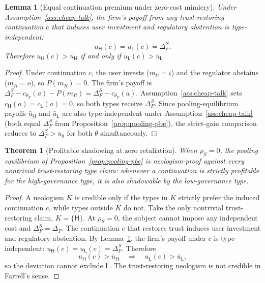 \documentclass[preprint,authoryear]{elsarticle}
\newtheorem{lemma}{Lemma}
\newtheorem{theorem}{Theorem}
\theoremstyle{definition}
\theoremstyle{plain}
\begin{document}
\begin{lemma}[Equal continuation premium under zero-cost mimicry]
\label{lem:equal-continuation}
Under Assumption~\ref{ass:cheap-talk}, the firm's payoff from any
trust-restoring continuation $c$ that induces user investment and regulatory
abstention is type-independent:
\[
u_\mathsf{H}(c)=u_\mathsf{L}(c)=\Delta_F^S .
\]
Therefore $u_\mathsf{H}(c)>\bar u_\mathsf{H}$ if and only if
$u_\mathsf{L}(c)>\bar u_\mathsf{L}$.
\end{lemma}
\begin{proof}
Under continuation $c$, the user invests ($m_U=i$) and the regulator abstains
($m_R=o$), so $P(m_R)=0$.  The firm's payoff is
$\Delta_F^S-c_{\theta_F}(a)-P(m_R)=\Delta_F^S-c_{\theta_F}(a)$.
Assumption~\ref{ass:cheap-talk} sets $c_\mathsf{H}(a)=c_\mathsf{L}(a)=0$,
so both types receive $\Delta_F^S$.  Since pooling-equilibrium payoffs
$\bar u_\mathsf{H}$ and $\bar u_\mathsf{L}$ are also type-independent under
Assumption~\ref{ass:cheap-talk} (both equal $\Delta_F^S$ from
Proposition~\ref{prop:pooling-pbe}), the strict-gain comparison reduces to
$\Delta_F^S>\bar u_\theta$ for both $\theta$ simultaneously.
\end{proof}

\begin{theorem}[Profitable shadowing at zero retaliation]
\label{thm:zero-retaliation-shadowing}
\label{thm:neologism}
When $\rho_S=0$, the pooling equilibrium of Proposition~\ref{prop:pooling-pbe} is neologism-proof against every nontrivial trust-restoring type claim: whenever a continuation is strictly profitable for the high-governance type, it is also shadowable by the low-governance type.
\end{theorem}
\begin{proof}
A neologism $K$ is credible only if the types in $K$ strictly prefer the induced continuation $c$, while types outside $K$ do not.  Take the only nontrivial trust-restoring claim, $K=\{\mathsf{H}\}$.  At $\rho_S=0$, the subject cannot impose any independent cost and $\Delta_F^S=\Delta_F$.  The continuation $c$ that restores trust induces user investment and regulatory abstention.  By Lemma~\ref{lem:equal-continuation}, the firm's payoff under $c$ is type-independent: $u_\mathsf{H}(c)=u_\mathsf{L}(c)=\Delta_F^S$.  Therefore
\[
u_\mathsf{H}(c)>\bar u_\mathsf{H}
\quad\Longrightarrow\quad
u_\mathsf{L}(c)>\bar u_\mathsf{L},
\]
so the deviation cannot exclude $\mathsf{L}$.  The trust-restoring neologism is not credible in Farrell's sense.
\end{proof}
\end{document}
